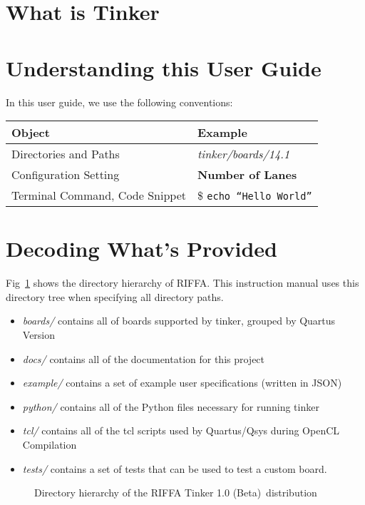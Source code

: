 \documentclass{refrep}
\newcommand{\TinkerVersion}{Tinker 1.0 (Beta)}
\newcommand{\Directory}[1]{\textit{#1}}
\newcommand{\TermCmd}[1]{\$ \texttt{#1}}
\newcommand{\ConfigSetting}[1]{\textbf{#1}}
\begin{document}
\section{What is Tinker}
\section{Understanding this User Guide}
In this user guide, we use the following conventions:
\begin{center}
  \begin{tabular}{ | l | l |}
    \hline
    Object & Example \\ \hline
    Directories and Paths & \Directory{tinker/boards/14.1}  \\ \hline
    Configuration Setting & \ConfigSetting{Number of Lanes} \\ \hline
    Terminal Command, Code Snippet & \TermCmd{echo ``Hello World''}\\ \hline
  \end{tabular}
\end{center}

\section{Decoding What's Provided}
\label{Chapter:Intro:Sec:Decoding}
Fig~\ref{Fig:Tinker:DirStructure} shows the directory hierarchy of RIFFA. This
instruction manual uses this directory tree when specifying all directory paths.

\begin{itemize}
\item \Directory{boards/} contains all of boards supported by tinker, grouped by Quartus Version
\item \Directory{docs/} contains all of the documentation for this project
\item \Directory{example/} contains a set of example user specifications (written in JSON)
\item \Directory{python/} contains all of the Python files necessary for running tinker
\item \Directory{tcl/} contains all of the tcl scripts used by Quartus/Qsys during OpenCL Compilation
\item \Directory{tests/} contains a set of tests that can be used to test a custom board. 
\end{itemize}

\begin{figure}[H]
  \caption{Directory hierarchy of the RIFFA \TinkerVersion~distribution} \label{Fig:Tinker:DirStructure}
\end{figure}
\end{document}

